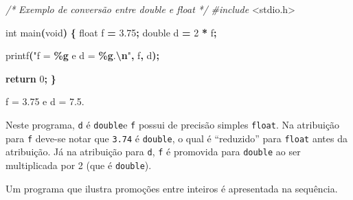 \documentclass[
  11pt,
  a4paper,
]{scrbook}
\newenvironment{Shaded}{\begin{snugshade}}{\end{snugshade}}
\newcommand{\CommentTok}[1]{\textcolor[rgb]{0.56,0.35,0.01}{\textit{#1}}}
\newcommand{\ControlFlowTok}[1]{\textcolor[rgb]{0.13,0.29,0.53}{\textbf{#1}}}
\newcommand{\DataTypeTok}[1]{\textcolor[rgb]{0.13,0.29,0.53}{#1}}
\newcommand{\DecValTok}[1]{\textcolor[rgb]{0.00,0.00,0.81}{#1}}
\newcommand{\FloatTok}[1]{\textcolor[rgb]{0.00,0.00,0.81}{#1}}
\newcommand{\ImportTok}[1]{#1}
\newcommand{\NormalTok}[1]{#1}
\newcommand{\OperatorTok}[1]{\textcolor[rgb]{0.81,0.36,0.00}{\textbf{#1}}}
\newcommand{\PreprocessorTok}[1]{\textcolor[rgb]{0.56,0.35,0.01}{\textit{#1}}}
\newcommand{\SpecialCharTok}[1]{\textcolor[rgb]{0.81,0.36,0.00}{\textbf{#1}}}
\newcommand{\StringTok}[1]{\textcolor[rgb]{0.31,0.60,0.02}{#1}}
\begin{document}
\begin{Shaded}
\begin{Highlighting}[]
\CommentTok{/*}
\CommentTok{Exemplo de conversão entre double e float}
\CommentTok{*/}
\PreprocessorTok{\#include }\ImportTok{\textless{}stdio.h\textgreater{}}

\DataTypeTok{int}\NormalTok{ main}\OperatorTok{(}\DataTypeTok{void}\OperatorTok{)} \OperatorTok{\{}
    \DataTypeTok{float}\NormalTok{ f }\OperatorTok{=} \FloatTok{3.75}\OperatorTok{;}
    \DataTypeTok{double}\NormalTok{ d }\OperatorTok{=} \DecValTok{2} \OperatorTok{*}\NormalTok{ f}\OperatorTok{;}

\NormalTok{    printf}\OperatorTok{(}\StringTok{"f = }\SpecialCharTok{\%g}\StringTok{ e d = }\SpecialCharTok{\%g}\StringTok{.}\SpecialCharTok{\textbackslash{}n}\StringTok{"}\OperatorTok{,}\NormalTok{ f}\OperatorTok{,}\NormalTok{ d}\OperatorTok{);}

    \ControlFlowTok{return} \DecValTok{0}\OperatorTok{;}
\OperatorTok{\}}
\end{Highlighting}
\end{Shaded}

\begin{Shaded}
\begin{Highlighting}[]
\NormalTok{f = 3.75 e d = 7.5.}
\end{Highlighting}
\end{Shaded}

Neste programa, \texttt{d} é \texttt{double}e \texttt{f} possui de
precisão simples \texttt{float}. Na atribuição para \texttt{f} deve-se
notar que \texttt{3.74} é \texttt{double}, o qual é ``reduzido'' para
\texttt{float} antes da atribuição. Já na atribuição para \texttt{d},
\texttt{f} é promovida para \texttt{double} ao ser multiplicada por 2
(que é \texttt{double}).

Um programa que ilustra promoções entre inteiros é apresentada na
sequência.
\end{document}
